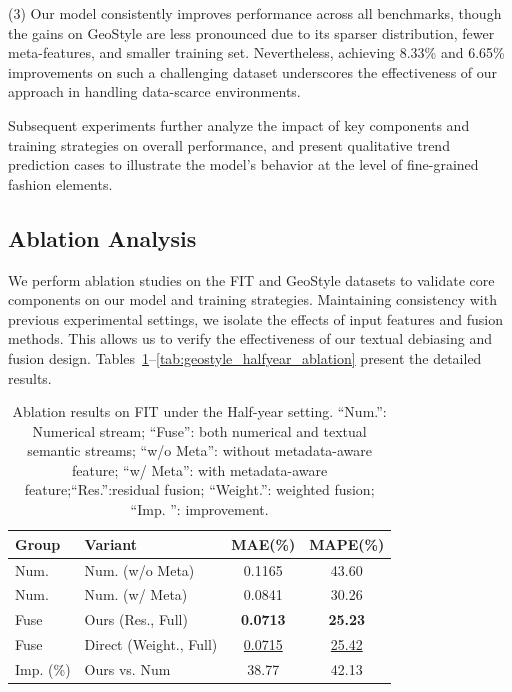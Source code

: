 \documentclass[Afour,sageh,times]{sagej}
\begin{document}
{(3) Our model consistently improves performance across all benchmarks, though the gains on GeoStyle are less pronounced due to its sparser distribution, fewer meta-features, and smaller training set. Nevertheless, achieving 8.33\% and 6.65\% improvements on such a challenging dataset underscores the effectiveness of our approach in handling data-scarce environments.

Subsequent experiments further analyze the impact of key components and training strategies on overall performance, and present qualitative trend prediction cases to illustrate the model’s behavior at the level of fine-grained fashion elements.

\subsection{Ablation Analysis}

We perform ablation studies on the FIT and GeoStyle datasets to validate core components on our model and training strategies. Maintaining consistency with previous experimental settings, we isolate the effects of input features and fusion methods. This allows us to verify the effectiveness of our textual debiasing and fusion design. Tables~\ref{tab:fit_halfyear_ablation}--\ref{tab:geostyle_halfyear_ablation} present the detailed results.

\begin{table}[t]
\centering
\caption{Ablation results on FIT under the Half-year setting. ``Num.'': Numerical stream; ``Fuse'': both numerical and textual semantic streams; ``w/o Meta'': without metadata-aware feature; ``w/ Meta'': with metadata-aware feature;``Res.'':residual fusion; ``Weight.'': weighted fusion;  ``Imp. '': improvement.}
\label{tab:fit_halfyear_ablation}
\begin{tabular}{l l c c}
\hline
\textbf{Group} & \textbf{Variant} & \textbf{MAE(\%)} & \textbf{MAPE(\%)} \\
\hline
Num. & Num. (w/o Meta) & 0.1165 & 43.60 \\
Num. & Num. (w/ Meta)  & 0.0841 & 30.26 \\
Fuse & Ours (Res., Full) & \textbf{0.0713} & \textbf{25.23 }\\
Fuse & Direct (Weight., Full) & \underline{0.0715} & \underline{25.42 }\\
\hline
Imp. (\%) & Ours vs. Num & 38.77 & 42.13  \\
\hline
\end{tabular}
\end{table}

}
\end{document}
